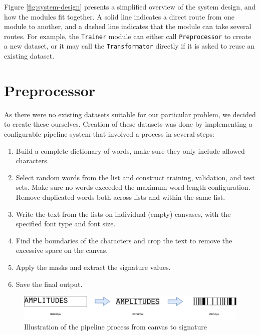 Figure \ref{fig:system-design} presents a simplified overview of the system design, and how the modules fit together. A solid line indicates a direct route from one module to another, and a dashed line indicates that the module can take several routes. For example, the {\tt Trainer} module can either call {\tt Preprocessor} to create a new dataset, or it may call the {\tt Transformator} directly if it is asked to reuse an existing dataset.


\section{Preprocessor}
\label{sec:preprocessor}
As there were no existing datasets suitable for our particular problem, we decided to create these ourselves. Creation of these datasets was done by implementing a configurable pipeline system that involved a process in several steps:

\begin{enumerate}
    \item Build a complete dictionary of words, make sure they only include allowed characters.
    \item Select random words from the list and construct training, validation, and test sets. Make sure no words exceeded the maximum word length configuration. Remove duplicated words both across lists and within the same list.
    \item Write the text from the lists on individual (empty) canvases, with the specified font type and font size.
    \item Find the boundaries of the characters and crop the text to remove the excessive space on the canvas.
    \item Apply the masks and extract the signature values.
    \item Save the final output.
\end{enumerate}

\begin{figure}[H]
    \centering
    \includegraphics[width=1\textwidth]{fig/development_process/pipeline.png}
    \caption{Illustration of the pipeline process from canvas to signature}
    \label{fig:development-pipeline}
\end{figure}

